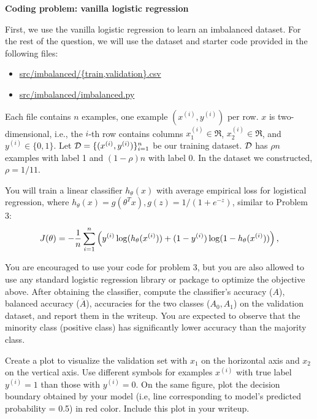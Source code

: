 \item {} \textbf{Coding problem: vanilla logistic regression}

First, we use the vanilla logistic regression to learn an imbalanced dataset. For the rest of the question, we will use the dataset and starter code provided in
the following files:
%
\begin{center}
	\begin{itemize}
		\item	\url{src/imbalanced/{train,validation}.csv}
		\item   \url{src/imbalanced/imbalanced.py}
	\end{itemize}
\end{center}


Each file contains $n$ examples, one example $(x^{(i)}, y^{(i)})$ per row. $x$ is two-dimensional, i.e., the $i$-th row contains columns $x^{(i)}_1\in\Re$,
$x^{(i)}_2\in\Re$, and $y^{(i)}\in\{0, 1\}$. Let $\mathcal{D}=\{(x^{(i)}, y^{(i)})\}_{i=1}^n$ be our training dataset. $\mathcal{D}$ has $\rho n$ examples with label 1 and $(1-\rho)n$ with label 0. In the dataset we constructed, $\rho=1/11$.

You will train a linear classifier $h_{\theta}(x)$ with average empirical loss for logistical regression, where $h_\theta(x)=g(\theta^T x), g(z)=1/(1+e^{-z})$, similar to Problem 3:
\begin{align*}
J(\theta) = -\frac{1}{{n}} \sum_{i=1}^{n} \left(y^{(i)}\log(h_{\theta}(x^{(i)}))
+  (1 - y^{(i)})\log(1 - h_{\theta}(x^{(i)}))\right),
\end{align*}

You are encouraged to use your code for problem 3, but you are also allowed to use any standard logistic regression library or package to optimize the objective above. After obtaining the classifier,
compute the classifier's accuracy ($A$), balanced accuracy ($\overline{A}$), accuracies for the two classes ($A_0, A_1$) on the validation dataset, and report them in the writeup. You are expected to observe that the minority class (positive class) has significantly lower accuracy than the majority class.


Create a plot to visualize the validation set with $x_1$ on the horizontal axis and $x_2$ on
the vertical axis. Use different symbols for examples $x^{(i)}$ with true label $y^{(i)} = 1$
than those with $y^{(i)} = 0$. On the same figure, plot the decision boundary obtained
by your model (i.e, line corresponding to model's predicted probability = 0.5) in red color. Include
this plot in your writeup.
